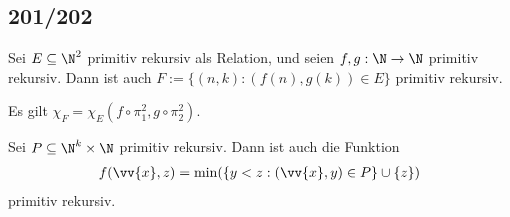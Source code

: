 \subsection*{201/202}
\begin{exercise}[201]

Sei $E \subseteq \N^2$ primitiv rekursiv als Relation, und seien $f,g: \N \to \N$
primitiv rekursiv. Dann ist auch $F := \{(n,k): (f(n),g(k)) \in E\}$ primitiv rekursiv.

\end{exercise}


\begin{solution}

Es gilt $\chi_F = \chi_E(f\circ\pi_1^2,g\circ\pi_2^2)$.

\end{solution}

\begin{exercise}[202]

Sei $P \subseteq \N^k \times \N$ primitiv rekursiv. Dann ist auch die Funktion
\begin{align*}
	f(\vv{x},z) = \min(\{y < z: (\vv{x},y) \in P\} \cup \{z\})
\end{align*}
primitiv rekursiv.

\end{exercise}


\begin{solution}

\phantom{}

\end{solution}
